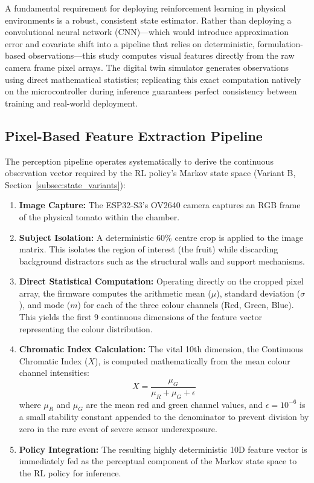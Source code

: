     A fundamental requirement for deploying reinforcement learning in physical environments is a robust, consistent state estimator. Rather than deploying a convolutional neural network (CNN)---which would introduce approximation error and covariate shift into a pipeline that relies on deterministic, formulation-based observations---this study computes visual features directly from the raw camera frame pixel arrays. The digital twin simulator generates observations using direct mathematical statistics; replicating this exact computation natively on the microcontroller during inference guarantees perfect consistency between training and real-world deployment.

    \subsection{Pixel-Based Feature Extraction Pipeline}
    
    The perception pipeline operates systematically to derive the continuous observation vector required by the RL policy's Markov state space (Variant B, Section~\ref{subsec:state_variants}):
    
    \begin{enumerate}
        \item \textbf{Image Capture:} The ESP32-S3's OV2640 camera captures an RGB frame of the physical tomato within the chamber.
        \item \textbf{Subject Isolation:} A deterministic 60\% centre crop is applied to the image matrix. This isolates the region of interest (the fruit) while discarding background distractors such as the structural walls and support mechanisms.
        \item \textbf{Direct Statistical Computation:} Operating directly on the cropped pixel array, the firmware computes the arithmetic mean ($\mu$), standard deviation ($\sigma$), and mode ($m$) for each of the three colour channels (Red, Green, Blue). This yields the first 9 continuous dimensions of the feature vector representing the colour distribution.
        \item \textbf{Chromatic Index Calculation:} The vital 10th dimension, the Continuous Chromatic Index ($X$), is computed mathematically from the mean colour channel intensities:
        \begin{equation}
            X = \frac{\mu_G}{\mu_R + \mu_G + \epsilon}
            \label{eq:chromatic_index}
        \end{equation}
        \noindent where $\mu_R$ and $\mu_G$ are the mean red and green channel values, and $\epsilon = 10^{-6}$ is a small stability constant appended to the denominator to prevent division by zero in the rare event of severe sensor underexposure.
        \item \textbf{Policy Integration:} The resulting highly deterministic 10D feature vector is immediately fed as the perceptual component of the Markov state space to the RL policy for inference.
    \end{enumerate}

